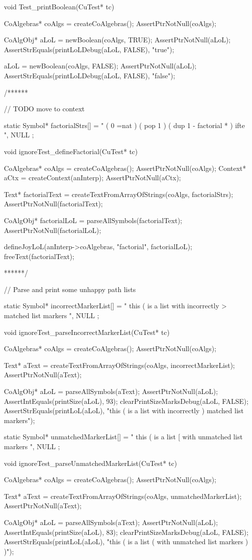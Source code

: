 void Test_printBoolean(CuTest* tc) {
  CoAlgebras* coAlgs = createCoAlgebras();
  AssertPtrNotNull(coAlgs);

  CoAlgObj* aLoL = newBoolean(coAlgs, TRUE);
  AssertPtrNotNull(aLoL);
  AssertStrEquals(printLoLDebug(aLoL, FALSE), "true");

  aLoL = newBoolean(coAlgs, FALSE);
  AssertPtrNotNull(aLoL);
  AssertStrEquals(printLoLDebug(aLoL, FALSE), "false");
}

/******

// TODO move to context

static Symbol* factorialStrs[] = {
  " ( 0 =nat ) ( pop 1 ) ( dup 1 - factorial * ) ifte ",
  NULL
};

void ignoreTest_defineFactorial(CuTest* tc) {
  CoAlgebras* coAlgs = createCoAlgebras();
  AssertPtrNotNull(coAlgs);
  Context* aCtx = createContext(anInterp);
  AssertPtrNotNull(aCtx);

  Text* factorialText = createTextFromArrayOfStrings(coAlgs, factorialStrs);
  AssertPtrNotNull(factorialText);

  CoAlgObj* factorialLoL = parseAllSymbols(factorialText);
  AssertPtrNotNull(factorialLoL);

  defineJoyLoL(anInterp->coAlgebras, "factorial", factorialLoL);
  freeText(factorialText);
}
******/

// Parse and print some unhappy path lists

static Symbol* incorrectMarkerList[] = {
  " this ( is a list with incorrectly > matched list markers ",
  NULL
};

void ignoreTest_parseIncorrectMarkerList(CuTest* tc) {
  CoAlgebras* coAlgs = createCoAlgebras();
  AssertPtrNotNull(coAlgs);

  Text* aText = createTextFromArrayOfStrings(coAlgs, incorrectMarkerList);
  AssertPtrNotNull(aText);

  CoAlgObj* aLoL = parseAllSymbols(aText);
  AssertPtrNotNull(aLoL);
  AssertIntEquals(printSize(aLoL), 93);
  clearPrintSizeMarksDebug(aLoL, FALSE);
  AssertStrEquals(printLoL(aLoL),
    "this ( is a list with incorrectly ) matched list markers");
}

static Symbol* unmatchedMarkerList[] = {
  " this ( is a list [ with unmatched list markers ",
  NULL
};

void ignoreTest_parseUnmatchedMarkerList(CuTest* tc) {
  CoAlgebras* coAlgs = createCoAlgebras();
  AssertPtrNotNull(coAlgs);

  Text* aText = createTextFromArrayOfStrings(coAlgs, unmatchedMarkerList);
  AssertPtrNotNull(aText);

  CoAlgObj* aLoL = parseAllSymbols(aText);
  AssertPtrNotNull(aLoL);
  AssertIntEquals(printSize(aLoL), 83);
  clearPrintSizeMarksDebug(aLoL, FALSE);
  AssertStrEquals(printLoL(aLoL),
    "this ( is a list ( with unmatched list markers ) )");
}
\stoptyping

